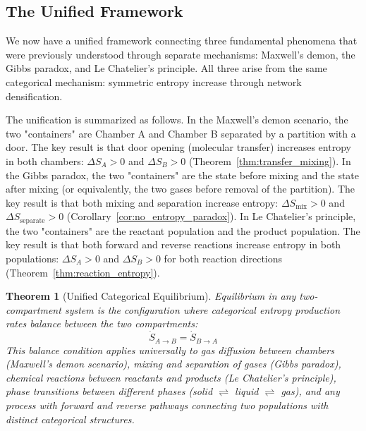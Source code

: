 \documentclass[12pt,a4paper]{article}
\newtheorem{theorem}{Theorem}[section]
\theoremstyle{definition}
\theoremstyle{remark}
\begin{document}
\subsection{The Unified Framework}

We now have a unified framework connecting three fundamental phenomena that were previously understood through separate mechanisms: Maxwell's demon, the Gibbs paradox, and Le Chatelier's principle. All three arise from the same categorical mechanism: symmetric entropy increase through network densification.

The unification is summarized as follows. In the Maxwell's demon scenario, the two "containers" are Chamber A and Chamber B separated by a partition with a door. The key result is that door opening (molecular transfer) increases entropy in both chambers: $\Delta S_A > 0$ and $\Delta S_B > 0$ (Theorem~\ref{thm:transfer_mixing}). In the Gibbs paradox, the two "containers" are the state before mixing and the state after mixing (or equivalently, the two gases before removal of the partition). The key result is that both mixing and separation increase entropy: $\Delta S_{\text{mix}} > 0$ and $\Delta S_{\text{separate}} > 0$ (Corollary~\ref{cor:no_entropy_paradox}). In Le Chatelier's principle, the two "containers" are the reactant population and the product population. The key result is that both forward and reverse reactions increase entropy in both populations: $\Delta S_A > 0$ and $\Delta S_B > 0$ for both reaction directions (Theorem~\ref{thm:reaction_entropy}).

\begin{theorem}[Unified Categorical Equilibrium]
\label{thm:unified_equilibrium}
Equilibrium in any two-compartment system is the configuration where categorical entropy production rates balance between the two compartments:
\begin{equation}
\boxed{\dot{S}_{A \to B} = \dot{S}_{B \to A}}
\label{eq:unified_equilibrium}
\end{equation}
This balance condition applies universally to gas diffusion between chambers (Maxwell's demon scenario), mixing and separation of gases (Gibbs paradox), chemical reactions between reactants and products (Le Chatelier's principle), phase transitions between different phases (solid $\rightleftharpoons$ liquid $\rightleftharpoons$ gas), and any process with forward and reverse pathways connecting two populations with distinct categorical structures.
\end{theorem}
\end{document}
